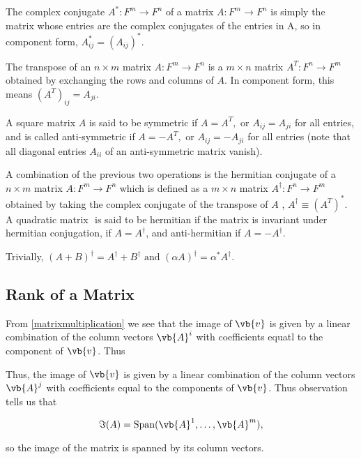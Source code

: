 \documentclass[a4paper,12pt]{report}
\begin{document}
The complex conjugate \(A^{*} : F^{m} \rightarrow F^{n}   \) of a matrix \(A: F^{m}\rightarrow F^{n}  \) is simply the matrix whose entries are the complex conjugates of the entries in A, so in component form, \(A^{*}_{ij} = (A_{ij} )^{*}   \).

The transpose of an \(n\times m\) matrix \(A: F^{m} \rightarrow F^{n}   \) is a \(m\times n\) matrix \(A^{T}: F^{n} \rightarrow F^{m}   \) obtained by exchanging the rows and columns of \(A\). In component form, this means \((A^{T} )_{ij} = A_{ji}  \). 

A square matrix \(A\) is said to be symmetric if \(A = A^{T}, \text { or } A_{ij} = A_{ji}   \) for all entries, and is called anti-symmetric if \(A = -A^{T}, \text { or } A_{ij} = -A_{ji}   \) for all entries (note that all diagonal entries \(A_{ii} \) of an anti-symmetric matrix vanish).        

A combination of the previous two operations is the hermitian conjugate of a \(n\times m\) matrix \(A: F^{m} \rightarrow F^{n} \) which is defined as a \(m\times n\) matrix \(A^{\dagger} : F^{n} \rightarrow F^{m}  \) obtained by taking the complex conjugate of the transpose of \(A\) , \ie \(A^{\dagger} \equiv (A^{T} )^{*} \). A quadratic matrix \(\) is said to be hermitian if the matrix is invariant under hermitian conjugation, \ie if \(A = A^{\dagger} \), and anti-hermitian if \(A = -A^{\dagger} \). 

Trivially, \((A+B)^{\dagger} = A^{\dagger} + B^{\dagger} \text { and } (\alpha A)^{\dagger} = \alpha ^{*} A^{\dagger}\).   

\subsection{Rank of a Matrix}

From \cref{matrixmultiplication} we see that the image of \(\vb{v} \) is given by a linear combination of the column vectors \(\vb{A} ^{i}\) with coefficients equatl to the component of \(\vb{v} \). Thus    

Thus, the image of \(\vb{v} \) is given by a linear combination of the column vectors \(\vb{A} ^{j} \) with coefficients equal to the components of \(\vb{v} \). Thus observation tells us that 

\begin{equation}
    \Im (A) = \text{Span}(\vb{A} ^{1} , \ldots , \vb{A} ^{m} ), 
\end{equation}

so the image of the matrix is spanned by its column vectors.
\end{document}
